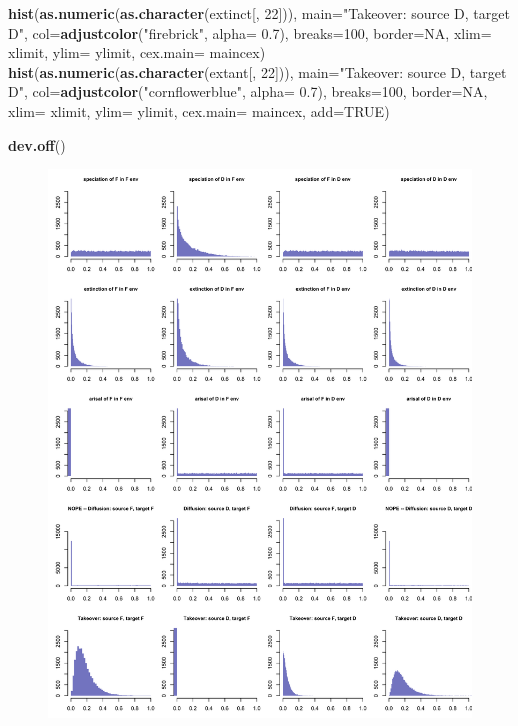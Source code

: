 \documentclass[]{book}
\newenvironment{Shaded}{\begin{snugshade}}{\end{snugshade}}
\newcommand{\KeywordTok}[1]{\textcolor[rgb]{0.13,0.29,0.53}{\textbf{{#1}}}}
\newcommand{\DataTypeTok}[1]{\textcolor[rgb]{0.13,0.29,0.53}{{#1}}}
\newcommand{\DecValTok}[1]{\textcolor[rgb]{0.00,0.00,0.81}{{#1}}}
\newcommand{\FloatTok}[1]{\textcolor[rgb]{0.00,0.00,0.81}{{#1}}}
\newcommand{\StringTok}[1]{\textcolor[rgb]{0.31,0.60,0.02}{{#1}}}
\newcommand{\OtherTok}[1]{\textcolor[rgb]{0.56,0.35,0.01}{{#1}}}
\newcommand{\NormalTok}[1]{{#1}}
\theoremstyle{definition}
\theoremstyle{definition}
\theoremstyle{definition}
\theoremstyle{remark}
\begin{document}
\begin{Shaded}
\begin{Highlighting}[]
\KeywordTok{hist}\NormalTok{(}\KeywordTok{as.numeric}\NormalTok{(}\KeywordTok{as.character}\NormalTok{(extinct[, }\DecValTok{22}\NormalTok{])), }\DataTypeTok{main=}\StringTok{"Takeover: source D, target D"}\NormalTok{, }\DataTypeTok{col=}\KeywordTok{adjustcolor}\NormalTok{(}\StringTok{"firebrick"}\NormalTok{, }\DataTypeTok{alpha=} \FloatTok{0.7}\NormalTok{), }\DataTypeTok{breaks=}\DecValTok{100}\NormalTok{, }\DataTypeTok{border=}\OtherTok{NA}\NormalTok{, }\DataTypeTok{xlim=}\NormalTok{ xlimit, }\DataTypeTok{ylim=}\NormalTok{ ylimit, }\DataTypeTok{cex.main=}\NormalTok{ maincex)}
\KeywordTok{hist}\NormalTok{(}\KeywordTok{as.numeric}\NormalTok{(}\KeywordTok{as.character}\NormalTok{(extant[, }\DecValTok{22}\NormalTok{])), }\DataTypeTok{main=}\StringTok{"Takeover: source D, target D"}\NormalTok{, }\DataTypeTok{col=}\KeywordTok{adjustcolor}\NormalTok{(}\StringTok{"cornflowerblue"}\NormalTok{, }\DataTypeTok{alpha=} \FloatTok{0.7}\NormalTok{), }\DataTypeTok{breaks=}\DecValTok{100}\NormalTok{, }\DataTypeTok{border=}\OtherTok{NA}\NormalTok{, }\DataTypeTok{xlim=}\NormalTok{ xlimit, }\DataTypeTok{ylim=}\NormalTok{ ylimit, }\DataTypeTok{cex.main=}\NormalTok{ maincex, }\DataTypeTok{add=}\OtherTok{TRUE}\NormalTok{)}


\KeywordTok{dev.off}\NormalTok{()}
\end{Highlighting}
\end{Shaded}

\begin{figure}
\centering
\includegraphics{Global_success_rate_per_parameter.png}
\caption{}
\end{figure}
\end{document}

